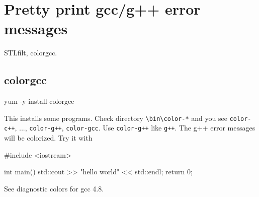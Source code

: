 \section{Pretty print gcc/g++ error messages}

STLfilt, colorgcc.

\subsection{colorgcc}

\begin{console}
yum -y install colorgcc
\end{console}
This installs some programs.
Check directory \verb!\bin\color-*! and you see
\verb!color-c++!, ..., \verb!color-g++!, \verb!color-gcc!.
Use \verb!color-g++! like \verb!g++!.
The g++ error messages will be colorized.
Try it with
\begin{console}
#include <iostream>

int main()
{
    std::cout >> "hello world" << std::endl;
    return 0;
}
\end{console}

See diagnostic colors for gcc 4.8.
